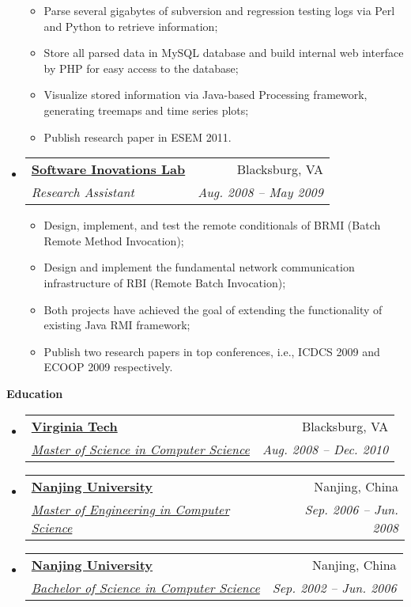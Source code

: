 \documentclass[letterpaper,11pt]{article}
\makeatletter
\newcommand{\resitem}[1]{\item #1 \vspace{-2pt}}
\newcommand{\resheading}[1]{{\large \colorbox{mygrey}{\begin{minipage}{\textwidth}{\textbf{#1 \vphantom{p\^{E}}}}\end{minipage}}}}
\newcommand{\ressubheading}[4]{
\begin{tabular*}{6.5in}{l@{\extracolsep{\fill}}r}
		\textbf{#1} & #2 \\
		\textit{#3} & \textit{#4} \\
\end{tabular*}\vspace{-6pt}}
\makeatother
\begin{document}
\begin{itemize}
{				\begin{itemize}
					\resitem{Parse several gigabytes of subversion and regression testing logs
					via Perl and Python to retrieve information;}
					\resitem{Store all parsed data in MySQL database and build internal web
					interface by PHP for easy access to the database;}
					\resitem{Visualize stored information via Java-based Processing framework, 
					generating treemaps and time series plots;}
					\resitem{Publish research paper in ESEM 2011.}
				\end{itemize}
				}
		\item 
			\ressubheading{\href{http://people.cs.vt.edu/~tilevich/}{Software
			Inovations Lab}}{Blacksburg, VA}{Research Assistant}{Aug. 2008 -- May 2009} 
			{\footnotesize
				\begin{itemize}
					\resitem{Design, implement, and test the remote conditionals of BRMI (Batch
					Remote Method Invocation);}
					\resitem{Design and implement the fundamental network communication
					infrastructure of RBI (Remote Batch Invocation);}
					\resitem{Both projects have achieved the goal of extending the
					functionality of existing Java RMI framework;}
					\resitem{Publish two research papers in top conferences, i.e., ICDCS 2009
					and ECOOP 2009 respectively.}
				\end{itemize}
				}
	\end{itemize}  %

\resheading{Education}
	\begin{itemize}
		\item
			\ressubheading{\href{http://www.vt.edu}{Virginia Tech}}{Blacksburg,
			VA}{\href{http://www.cs.vt.edu/}{Master of Science
			in Computer Science}}{Aug. 2008 -- Dec. 2010}
		\item
			\ressubheading{\href{http://www.nju.edu.cn}{Nanjing University}}{Nanjing,
			China}{\href{http://cs.nju.edu.cn/}{Master of Engineering
			in Computer Science}}{Sep. 2006 -- Jun. 2008}
		\item
			\ressubheading{\href{http://www.nju.edu.cn}{Nanjing University}}{Nanjing,
			China}{\href{http://cs.nju.edu.cn/}{Bachelor of Science
			in Computer Science}}{Sep. 2002 -- Jun. 2006}
	\end{itemize} %
\end{document}
